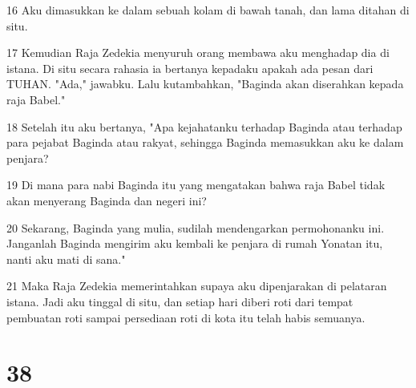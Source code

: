 \par 16 Aku dimasukkan ke dalam sebuah kolam di bawah tanah, dan lama ditahan di situ.
\par 17 Kemudian Raja Zedekia menyuruh orang membawa aku menghadap dia di istana. Di situ secara rahasia ia bertanya kepadaku apakah ada pesan dari TUHAN. "Ada," jawabku. Lalu kutambahkan, "Baginda akan diserahkan kepada raja Babel."
\par 18 Setelah itu aku bertanya, "Apa kejahatanku terhadap Baginda atau terhadap para pejabat Baginda atau rakyat, sehingga Baginda memasukkan aku ke dalam penjara?
\par 19 Di mana para nabi Baginda itu yang mengatakan bahwa raja Babel tidak akan menyerang Baginda dan negeri ini?
\par 20 Sekarang, Baginda yang mulia, sudilah mendengarkan permohonanku ini. Janganlah Baginda mengirim aku kembali ke penjara di rumah Yonatan itu, nanti aku mati di sana."
\par 21 Maka Raja Zedekia memerintahkan supaya aku dipenjarakan di pelataran istana. Jadi aku tinggal di situ, dan setiap hari diberi roti dari tempat pembuatan roti sampai persediaan roti di kota itu telah habis semuanya.

\chapter{38}

